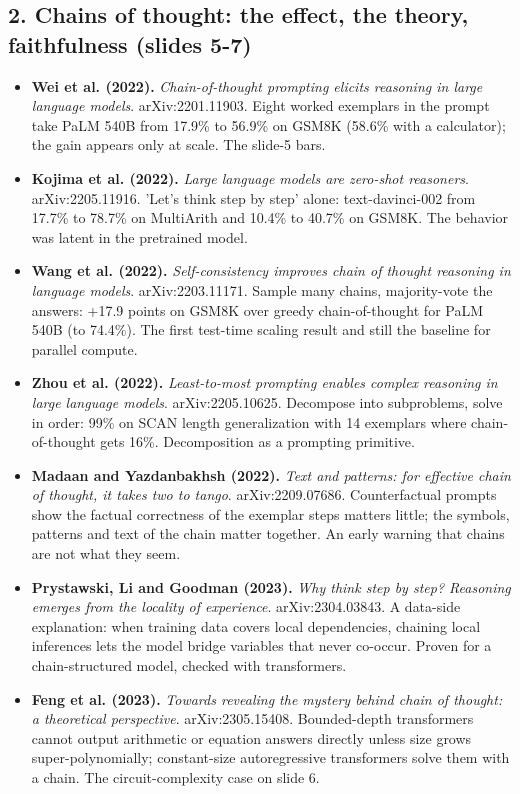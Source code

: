 \subsection*{2. Chains of thought: the effect, the theory, faithfulness (slides 5-7)}
\begin{itemize}[leftmargin=1.2em,itemsep=3pt]\sloppy
\item \textbf{Wei et al. (2022).} \textit{Chain-of-thought prompting elicits reasoning in large language models}. arXiv:2201.11903. Eight worked exemplars in the prompt take PaLM 540B from 17.9\% to 56.9\% on GSM8K (58.6\% with a calculator); the gain appears only at scale. The slide-5 bars.
\item \textbf{Kojima et al. (2022).} \textit{Large language models are zero-shot reasoners}. arXiv:2205.11916. 'Let's think step by step' alone: text-davinci-002 from 17.7\% to 78.7\% on MultiArith and 10.4\% to 40.7\% on GSM8K. The behavior was latent in the pretrained model.
\item \textbf{Wang et al. (2022).} \textit{Self-consistency improves chain of thought reasoning in language models}. arXiv:2203.11171. Sample many chains, majority-vote the answers: +17.9 points on GSM8K over greedy chain-of-thought for PaLM 540B (to 74.4\%). The first test-time scaling result and still the baseline for parallel compute.
\item \textbf{Zhou et al. (2022).} \textit{Least-to-most prompting enables complex reasoning in large language models}. arXiv:2205.10625. Decompose into subproblems, solve in order: 99\% on SCAN length generalization with 14 exemplars where chain-of-thought gets 16\%. Decomposition as a prompting primitive.
\item \textbf{Madaan and Yazdanbakhsh (2022).} \textit{Text and patterns: for effective chain of thought, it takes two to tango}. arXiv:2209.07686. Counterfactual prompts show the factual correctness of the exemplar steps matters little; the symbols, patterns and text of the chain matter together. An early warning that chains are not what they seem.
\item \textbf{Prystawski, Li and Goodman (2023).} \textit{Why think step by step? Reasoning emerges from the locality of experience}. arXiv:2304.03843. A data-side explanation: when training data covers local dependencies, chaining local inferences lets the model bridge variables that never co-occur. Proven for a chain-structured model, checked with transformers.
\item \textbf{Feng et al. (2023).} \textit{Towards revealing the mystery behind chain of thought: a theoretical perspective}. arXiv:2305.15408. Bounded-depth transformers cannot output arithmetic or equation answers directly unless size grows super-polynomially; constant-size autoregressive transformers solve them with a chain. The circuit-complexity case on slide 6.

\end{itemize}
